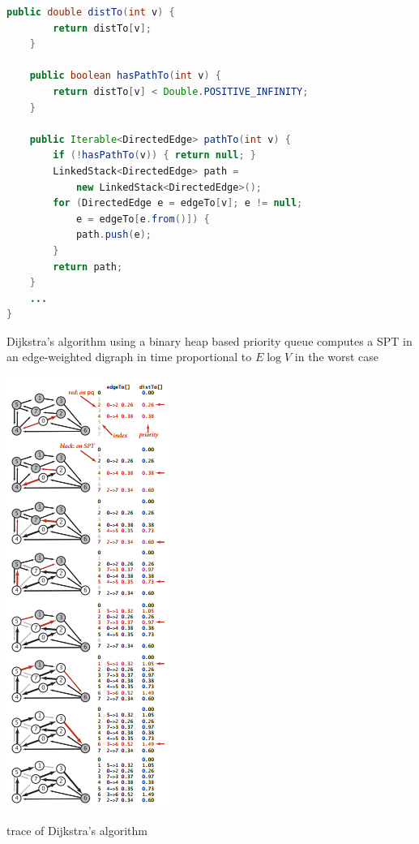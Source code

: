 \documentclass[8pt,a4paper,compress]{beamer}
\begin{document}
\begin{frame}[fragile]
\begin{minipage}{220pt}
\begin{lstlisting}[language=Java]
    public double distTo(int v) { 
        return distTo[v]; 
    }

    public boolean hasPathTo(int v) { 
        return distTo[v] < Double.POSITIVE_INFINITY; 
    }
    
    public Iterable<DirectedEdge> pathTo(int v) {
        if (!hasPathTo(v)) { return null; }
        LinkedStack<DirectedEdge> path = 
            new LinkedStack<DirectedEdge>();
        for (DirectedEdge e = edgeTo[v]; e != null; 
            e = edgeTo[e.from()]) {
            path.push(e);
        }
        return path;
    }
    ...
}
\end{lstlisting}

\bigskip

Dijkstra's algorithm using a binary heap based priority queue computes a SPT in an edge-weighted digraph in time proportional to $E\log V$ in the worst case
\end{minipage}%
\begin{minipage}{80pt}
\begin{center}
\includegraphics[scale=0.42]{./figures/sp4.png}

\smallskip

\small trace of Dijkstra's algorithm
\end{center}
\end{minipage}
\end{frame}
\end{document}
